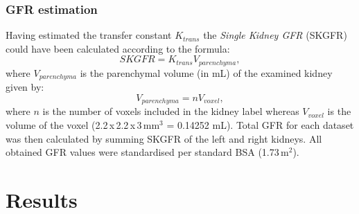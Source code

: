 \subsubsection{GFR estimation}
Having estimated the transfer constant $K_{trans}$ the \textit{Single Kidney GFR} (SKGFR) could have been calculated according to the formula:
\begin{equation}
SKGFR = K_{trans}V_{parenchyma},
\end{equation}
where $V_{parenchyma}$ is the parenchymal volume (in mL) of the examined kidney given by:
\begin{equation}
V_{parenchyma} = nV_{voxel},
\end{equation}
where $n$ is the number of voxels included in the kidney label whereas $V_{voxel}$ is the volume of the voxel (2.2\,x\,2.2\,x\,3\,mm$^3$ = 0.14252 mL). Total GFR for each dataset was then calculated by summing SKGFR of the left and right kidneys. All obtained GFR values were standardised per standard BSA (1.73\,m$^2$).
\section{Results}

